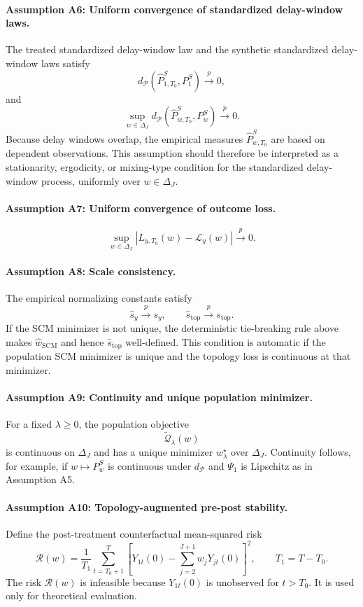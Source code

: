 \documentclass[11pt]{article}
\theoremstyle{plain}
\theoremstyle{definition}
\theoremstyle{remark}
\newcommand{\1}{\mathbbm{1}}
\newcommand{\SCM}{\mathrm{SCM}}
\newcommand{\pto}{\xrightarrow{p}}
\begin{document}
\paragraph{Assumption A6: Uniform convergence of standardized delay-window laws.}
The treated standardized delay-window law and the synthetic standardized
delay-window laws satisfy
\[
d_{\mathcal P}
\left(
\widehat P_{1,T_0}^{S},
P_1^{S}
\right)
\pto 0,
\]
and
\[
\sup_{w\in\Delta_J}
d_{\mathcal P}
\left(
\widehat P_{w,T_0}^{S},
P_w^{S}
\right)
\pto 0.
\]
Because delay windows overlap, the empirical measures
\(\widehat P_{w,T_0}^{S}\) are based on dependent observations. This assumption
should therefore be interpreted as a stationarity, ergodicity, or mixing-type
condition for the standardized delay-window process, uniformly over
\(w\in\Delta_J\).

\paragraph{Assumption A7: Uniform convergence of outcome loss.}
\[
\sup_{w\in\Delta_J}
\left|
L_{y,T_0}(w)-\mathcal L_y(w)
\right|
\pto 0.
\]

\paragraph{Assumption A8: Scale consistency.}
The empirical normalizing constants satisfy
\[
\widehat s_y \pto s_y,
\qquad
\widehat s_{\mathrm{top}}\pto s_{\mathrm{top}}.
\]
If the SCM minimizer is not unique, the deterministic tie-breaking rule above
makes \(\widehat w_{\SCM}\) and hence \(\widehat s_{\mathrm{top}}\) well-defined.
This condition is automatic if the population SCM minimizer is unique and the
topology loss is continuous at that minimizer.

\paragraph{Assumption A9: Continuity and unique population minimizer.}
For a fixed \(\lambda\ge0\), the population objective
\[
\widetilde{\mathcal Q}_{\lambda}(w)
\]
is continuous on \(\Delta_J\) and has a unique minimizer \(w_\lambda^\star\)
over \(\Delta_J\). Continuity follows, for example, if \(w\mapsto P_w^{S}\) is
continuous under \(d_{\mathcal P}\) and \(\Psi_1\) is Lipschitz as in
Assumption A5.

\paragraph{Assumption A10: Topology-augmented pre-post stability.}
Define the post-treatment counterfactual mean-squared risk
\[
\mathcal R(w)
=
\frac{1}{T_1}
\sum_{t=T_0+1}^{T}
\left[
Y_{1t}(0)
-
\sum_{j=2}^{J+1}w_jY_{jt}(0)
\right]^2,
\qquad
T_1=T-T_0.
\]
The risk \(\mathcal R(w)\) is infeasible because \(Y_{1t}(0)\) is unobserved for
\(t>T_0\). It is used only for theoretical evaluation.
\end{document}
